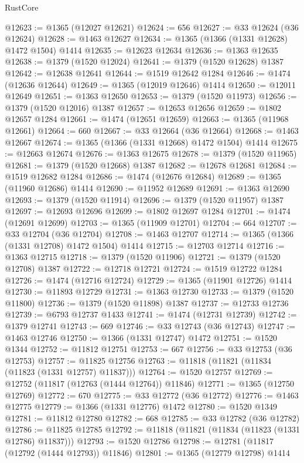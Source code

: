 \begin{lexlean}{RustCore}
\begin{coremodule}
@12623 := @1365 (@12027 @12621)
@12624 := 656
@12627 := @33 @12624 (@36 @12624)
@12628 := @1463 @12627
@12634 := @1365 (@1366 (@1331 @12628) @1472 @1504) @1414
@12635 := @12623 @12634
@12636 := @1363 @12635
@12638 := @1379 (@1520 @12024)
@12641 := @1379 (@1520 @12628) @1387
@12642 := @12638 @12641
@12644 := @1519 @12642 @1284
@12646 := @1474 (@12636 @12644)
@12649 := @1365 (@12019 @12646) @1414
@12650 := @12011 @12649
@12651 := @1363 @12650
@12653 := @1379 (@1520 @11973)
@12656 := @1379 (@1520 @12016) @1387
@12657 := @12653 @12656
@12659 := @1802 @12657 @1284
@12661 := @1474 (@12651 @12659)
@12663 := @1365 (@11968 @12661)
@12664 := 660
@12667 := @33 @12664 (@36 @12664)
@12668 := @1463 @12667
@12674 := @1365 (@1366 (@1331 @12668) @1472 @1504) @1414
@12675 := @12663 @12674
@12676 := @1363 @12675
@12678 := @1379 (@1520 @11965)
@12681 := @1379 (@1520 @12668) @1387
@12682 := @12678 @12681
@12684 := @1519 @12682 @1284
@12686 := @1474 (@12676 @12684)
@12689 := @1365 (@11960 @12686) @1414
@12690 := @11952 @12689
@12691 := @1363 @12690
@12693 := @1379 (@1520 @11914)
@12696 := @1379 (@1520 @11957) @1387
@12697 := @12693 @12696
@12699 := @1802 @12697 @1284
@12701 := @1474 (@12691 @12699)
@12703 := @1365 (@11909 @12701)
@12704 := 664
@12707 := @33 @12704 (@36 @12704)
@12708 := @1463 @12707
@12714 := @1365 (@1366 (@1331 @12708) @1472 @1504) @1414
@12715 := @12703 @12714
@12716 := @1363 @12715
@12718 := @1379 (@1520 @11906)
@12721 := @1379 (@1520 @12708) @1387
@12722 := @12718 @12721
@12724 := @1519 @12722 @1284
@12726 := @1474 (@12716 @12724)
@12729 := @1365 (@11901 @12726) @1414
@12730 := @11893 @12729
@12731 := @1363 @12730
@12733 := @1379 (@1520 @11800)
@12736 := @1379 (@1520 @11898) @1387
@12737 := @12733 @12736
@12739 := @6793 @12737 @1433
@12741 := @1474 (@12731 @12739)
@12742 := @1379 @12741
@12743 := 669
@12746 := @33 @12743 (@36 @12743)
@12747 := @1463 @12746
@12750 := @1366 (@1331 @12747) @1472
@12751 := @1520 @1344
@12752 := @11812 @12751
@12753 := 667
@12756 := @33 @12753 (@36 @12753)
@12757 := @11825 @12756
@12763 := @11818 (@11821 (@11834 (@11823 (@1331 @12757) @11837)))
@12764 := @1520 @12757
@12769 := @12752 (@11817 (@12763 (@1444 @12764)) @11846)
@12771 := @1365 (@12750 @12769)
@12772 := 670
@12775 := @33 @12772 (@36 @12772)
@12776 := @1463 @12775
@12779 := @1366 (@1331 @12776) @1472
@12780 := @1520 @1349
@12781 := @11812 @12780
@12782 := 668
@12785 := @33 @12782 (@36 @12782)
@12786 := @11825 @12785
@12792 := @11818 (@11821 (@11834 (@11823 (@1331 @12786) @11837)))
@12793 := @1520 @12786
@12798 := @12781 (@11817 (@12792 (@1444 @12793)) @11846)
@12801 := @1365 (@12779 @12798) @1414

\end{coremodule}
\end{lexlean}
